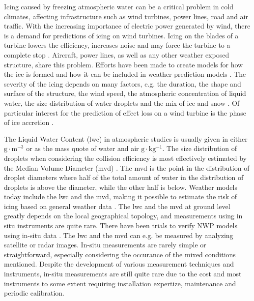 Icing caused by freezing atmospheric water can be a critical problem in cold climates, affecting infrastructure such as wind turbines, power lines, road and air traffic. With the increasing importance of electric power generated by wind, there is a demand for predictions of icing on wind turbines. Icing on the blades of a turbine lowers the efficiency, increases noise and may force the turbine to a complete stop \cite{dalili2009,cost727,homo2012,jasin1998}. Aircraft, power lines, as well as any other weather exposed structure, share this problem. Efforts have been made to create models for how the ice is formed \cite{makk2000,makk2001,shin1992} and how it can be included in weather prediction models \cite{thomp2009,kring2011}. The severity of the icing depends on many factors, e.g. the duration, the shape and surface of the structure, the wind speed, the atmospheric concentration of liquid water, the size distribution of water droplets and the mix of ice and snow \cite{kring2011,makk2000,makk2001,homo2010,han2012}. Of particular interest for the prediction of effect loss on a wind turbine is the phase of ice accretion \cite{davis2014}.

The Liquid Water Content (\gls{lwc}) in atmospheric studies is usually given in either $\mathrm{g\cdot m^{-3}}$ \cite{sein1998} or as the mass quote of water and air $\mathrm{g\cdot kg^{-1}}$. The size distribution of droplets when considering the collision efficiency is most effectively estimated by the Median Volume Diameter (\gls{mvd}) \cite{fins1988}. The \gls{mvd} is the point in the distribution of droplet diameters where half of the total amount of water in the distribution of droplets is above the diameter, while the other half is below. Weather models today include the \gls{lwc} and the \gls{mvd}, making it possible to estimate the risk of icing based on general weather data \cite{thomp2009}. The \gls{lwc} and the \gls{mvd} at ground level greatly depends on the local geographical topology, and measurements using in situ instruments are quite rare. There have been trials to verify NWP models using in-situ data \cite{berg2013}. The \gls{lwc} and the \gls{mvd} can e.g. be measured by analyzing satellite or radar images. In-situ measurements are rarely simple or straightforward, especially considering the occurance of the mixed conditions mentioned. Despite the development of various measurement techniques and instruments, in-situ measurements are still quite rare due to the cost and most instruments to some extent requiring installation expertize, maintenance and periodic calibration.

